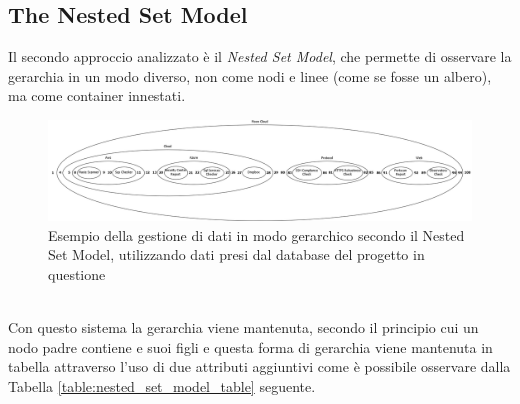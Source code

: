 \newpage

\subsection{The Nested Set Model}
Il secondo approccio analizzato è il \textit{Nested Set Model}, che permette di osservare la gerarchia in un modo diverso, non 
come nodi e linee (come se fosse un albero), ma come container innestati.

\begin{figure}[ht!]
	\includegraphics[scale=0.30]{images/MC_Rec_NSM_Container.png}
	\caption{Esempio della gestione di dati in modo gerarchico secondo il Nested Set Model, utilizzando dati presi dal database del 
	progetto in questione}
	\label{fig:MC_Rec_NSM_Container}
\end{figure}
\ \\
Con questo sistema la gerarchia viene mantenuta, secondo il principio cui un nodo padre contiene e suoi figli e questa forma di 
gerarchia viene mantenuta in tabella attraverso l'uso di due attributi aggiuntivi come è possibile osservare dalla Tabella 
\ref{table:nested_set_model_table} seguente. 

